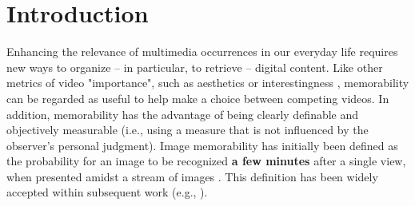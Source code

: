 \documentclass[sigconf]{acmart}
\begin{document}


\maketitle


\section{Introduction}%
Enhancing the relevance of multimedia occurrences in our everyday life requires new ways to organize -- in particular, to retrieve -- digital content.
Like other metrics of video "importance", such as aesthetics \cite{dhar_2011_high} or interestingness \cite{demarty_2016_mediaeval}, memorability can be regarded as useful to help make a choice between competing videos.
In addition, memorability has the advantage of being clearly definable and objectively measurable (i.e., using a measure that is not influenced by the observer's personal judgment).
Image memorability has initially been defined as the probability for an image to be recognized \textbf{a few minutes} after a single view, when presented amidst a stream
of images \cite{isola_2011_makes}.
This definition has been widely accepted within subsequent work (e.g., \cite{mancas_2013_memorability,kim_2013_relative,celikkale_2013_visual,khosla_2015_understanding,lahrache_2016_bag}).
\end{document}
